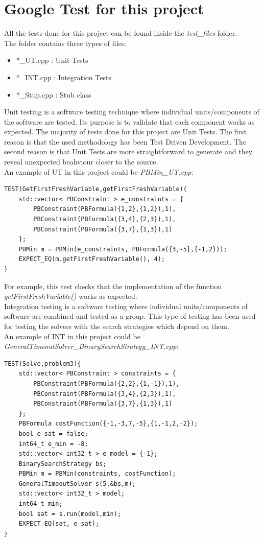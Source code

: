 \section{Google Test for this project}
All the tests done for this project can be found inside the \emph{test\_files} folder.\\
The folder contains three types of files:
\begin{itemize}
	\item *\_UT.cpp : Unit Tests
	\item *\_INT.cpp : Integration Tests
	\item *\_Stup.cpp : Stub class
\end{itemize}
Unit testing is a software testing technique where individual units/components of the software are tested. Its purpose is to validate that each component works as expected. The majority of tests done for this project are Unit Tests. The first reason is that the used methodology has been Test Driven Development. The second reason is that Unit Tests are more straightforward to generate and they reveal unexpected beahviour closer to the source.\\
An example of UT in this project could be \emph{PBMin\_UT.cpp}:
\begin{verbatim}
TEST(GetFirstFreshVariable,getFirstFreshVariable){
    std::vector< PBConstraint > e_constraints = {
        PBConstraint(PBFormula({1,2},{1,2}),1),
        PBConstraint(PBFormula({3,4},{2,3}),1),
        PBConstraint(PBFormula({3,7},{1,3}),1)
    };
    PBMin m = PBMin(e_constraints, PBFormula({3,-5},{-1,2}));
    EXPECT_EQ(m.getFirstFreshVariable(), 4);
}
\end{verbatim}
For example, this test checks that the implementation of the function \emph{getFirstFreshVariable()} works as expected.\\
Integration testing is a software testing where individual units/components of software are combined and tested as a group. This type of testing has been used for testing the solvers with the search strategies which depend on them.\\
An example of INT in this project could be \emph{GeneralTimeoutSolver\_BinarySearchStrategy\_INT.cpp}:
\begin{verbatim}
TEST(Solve,problem3){
    std::vector< PBConstraint > constraints = {
        PBConstraint(PBFormula({2,2},{1,-1}),1),
        PBConstraint(PBFormula({3,4},{2,3}),1),
        PBConstraint(PBFormula({3,7},{1,3}),1)
    };
    PBFormula costFunction({-1,-3,7,-5},{1,-1,2,-2});
    bool e_sat = false;
    int64_t e_min = -8;
    std::vector< int32_t > e_model = {-1};
    BinarySearchStrategy bs;
    PBMin m = PBMin(constraints, costFunction);
    GeneralTimeoutSolver s(5,&bs,m);
    std::vector< int32_t > model;
    int64_t min;
    bool sat = s.run(model,min);
    EXPECT_EQ(sat, e_sat);
}
\end{verbatim}
